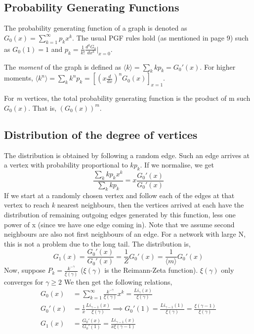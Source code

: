 \documentclass{article}
\begin{document}
\subsection{Probability Generating Functions}
The probability generating function of a graph is denoted as $G_0(x) = \sum_{k=1}^{\infty} p_k x^k$. The usual PGF rules hold (as mentioned in page 9) such as $G_0(1) = 1$ and $p_k = \frac{1}{k!} \frac{d^k G_0}{dx^k} \vert_{x=0}$. 

The {\it moment} of the graph is defined as $\langle k \rangle = \sum_k kp_k = G_0'(x)$.
For higher moments, $\langle k^n \rangle = \sum_k k^n p_k = \left[ \left(x \frac{d}{dx}\right)^n G_0(x)\right]_{x=1}$.

For {\it m} vertices, the total probability generating function is the product of m such $G_0(x)$. That is, $(G_0(x))^m$.

\subsection{Distribution of the degree of vertices}

The distribution is obtained by following a random edge. Such an edge arrives at a vertex with probability proportional to $kp_k$. If we normalise, we get
$$\frac{\sum_k kp_k x^k}{\sum_k kp_k} = x \frac{G_0'(x)}{G_0'(x)}$$
If we start at a randomly chosen vertex and follow each of the edges at that vertex to reach {\it k} nearest neighbours, then the vertices arrived at each have the distribution of remaining outgoing edges generated by this function, less one power of x (since we have one edge coming in). Note that we assume second neighbours are also not first neighbours of an edge. For a network with large N, this is not a problem due to the long tail. The distribution is,
$$G_1(x) = \frac{G_0'(x)}{G_0'(x)} = \frac{1}{Z}G_0'(x) = \frac{1}{\langle m \rangle} G_0'(x)$$
Now, suppose $P_k = \frac{k^{-\gamma}}{\xi(\gamma)}$ ($\xi(\gamma)$ is the Reimann-Zeta function). $\xi(\gamma)$ only converges for $\gamma \geq 2$ We then get the following relations,
\begin{align*}
G_0(x) &= \sum_{k=1}^{\infty} \frac{k^{-\gamma}}{\xi(\gamma)}x^k = \frac{Li_{\gamma}(x)}{\xi(\gamma)} \\
G_0'(x) &= \frac{1}{x}\frac{Li_{\gamma -1}(x)}{\xi(\gamma)} \implies G_0'(1) = \frac{Li_{\gamma-1}(1)}{\xi(\gamma)} = \frac{\xi(\gamma-1)}{\xi(\gamma)} \\
G_1(x) &= \frac{G_0'(x)}{G_0'(1)} = \frac{Li_{\gamma-1}(x)}{x\xi(\gamma-1)}
\end{align*}
\end{document}
